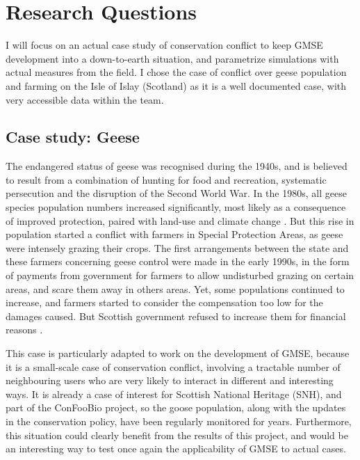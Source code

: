 \documentclass[12pt,a4paper]{article}
\begin{document}
\section{Research Questions}
I will focus on an actual case study of conservation conflict to keep GMSE development into a down-to-earth situation, and parametrize simulations with actual measures from the field.
I chose the case of conflict over geese population and farming on the Isle of Islay (Scotland) as it is a well documented case, with very accessible data within the team.

\subsection{Case study: Geese}

The endangered status of geese was recognised during the 1940s, and is believed to result from a combination of hunting for food and recreation, systematic persecution and the disruption of the Second World War. %
In the 1980s, all geese species population numbers increased significantly, most likely as a consequence of improved protection, paired with land-use and climate change \citep{mason2017changing}.
But this rise in population started a conflict with farmers in Special Protection Areas, as geese were intensely grazing their crops.
The first arrangements between the state and these farmers concerning geese control were made in the early 1990s, in the form of payments from government for farmers to allow undisturbed grazing on certain areas, and scare them away in others areas.
Yet, some populations continued to increase, and farmers started to consider the compensation too low for the damages caused.
But Scottish government refused to increase them for financial reasons \citep{bainbridge2017goose}.

This case is particularly adapted to work on the development of GMSE, because it is a small-scale case of conservation conflict, involving a tractable number of neighbouring users who are very likely to interact in different and interesting ways.
It is already a case of interest for Scottish National Heritage (SNH), and part of the ConFooBio project, so the goose population, along with the updates in the conservation policy, have been regularly monitored for years.
Furthermore, this situation could clearly benefit from the results of this project, and would be an interesting way to test once again the applicability of GMSE to actual cases.
\end{document}
